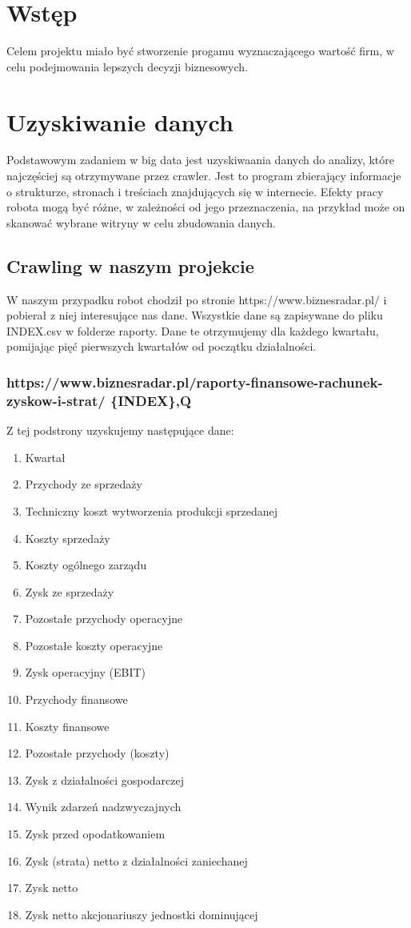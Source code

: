 \section{Wstęp}
Celem projektu miało być stworzenie progamu wyznaczającego wartość firm, w celu podejmowania
lepszych decyzji biznesowych.
\section{Uzyskiwanie danych}

Podstawowym zadaniem w big data jest uzyskiwaania danych do analizy, które najczęściej są otrzymywane przez crawler. Jest to program zbierający informacje o strukturze, stronach i treściach znajdujących się w internecie. Efekty pracy robota mogą być różne, w zależności od jego przeznaczenia, na przykład może on skanować wybrane witryny w celu zbudowania danych.

\subsection{Crawling w naszym projekcie}

W naszym przypadku robot chodził po stronie https://www.biznesradar.pl/ i pobierał z niej interesujące nas dane.
Wszystkie dane są zapisywane do pliku {INDEX}.csv w folderze raporty. Dane te otrzymujemy dla każdego kwartału, pomijając pięć pierwszych kwartałów od początku działalności.

\subsubsection{https://www.biznesradar.pl/raporty-finansowe-rachunek-zyskow-i-strat/ \{INDEX\},Q}
Z tej podstrony uzyskujemy następujące dane:
\begin{enumerate}
	\item Kwartał
	\item Przychody ze sprzedaży
	\item Techniczny koszt wytworzenia produkcji sprzedanej
	\item Koszty sprzedaży
	\item Koszty ogólnego zarządu
	\item Zysk ze sprzedaży
	\item Pozostałe przychody operacyjne
	\item Pozostałe koszty operacyjne
	\item Zysk operacyjny (EBIT)
	\item Przychody finansowe
	\item Koszty finansowe
	\item Pozostałe przychody (koszty)
	\item Zysk z działalności gospodarczej
	\item Wynik zdarzeń nadzwyczajnych
	\item Zysk przed opodatkowaniem
	\item Zysk (strata) netto z działalności zaniechanej
	\item Zysk netto
	\item Zysk netto akcjonariuszy jednostki dominującej
\end{enumerate}

